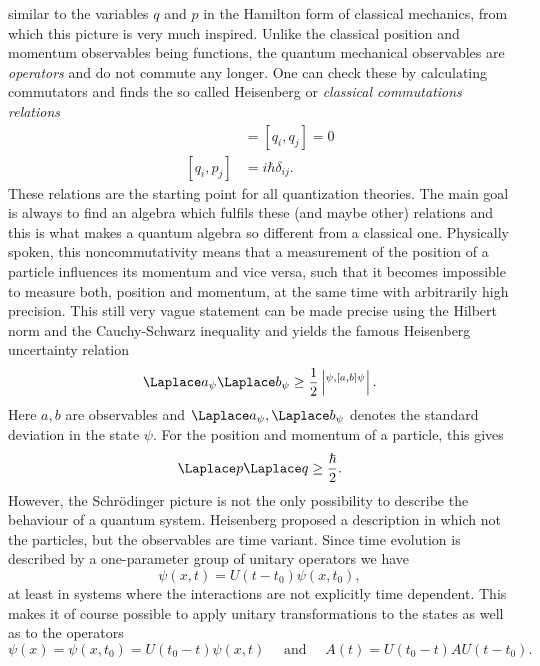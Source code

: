 similar to the variables $q$ and $p$ in the Hamilton form of classical 
mechanics, from which this picture is very much inspired. Unlike the classical 
position and momentum observables being functions, the quantum mechanical 
observables are \emph{operators} and do not commute any longer. One can check 
these by calculating commutators and finds the so called Heisenberg or 
\emph{classical commutations relations}
\begin{align}
	[p_i, p_j]
	& =
	[q_i, q_j]
	=
	0
	\\
	[q_i, p_j]
	& =
	i \hbar \delta_{ij}.
\end{align}
These relations are the starting point for all quantization theories. The main 
goal is always to find an algebra which fulfils these (and maybe other) 
relations and this is what makes a quantum algebra so different from a 
classical one. Physically spoken, this noncommutativity means that a 
measurement of the position of a particle influences its momentum and vice 
versa, such that it becomes impossible to measure both, position and momentum, 
at the same time with arbitrarily high precision. This still very vague 
statement can be made precise using the Hilbert norm and the Cauchy-Schwarz 
inequality and yields the famous Heisenberg uncertainty relation
\begin{equation*}
	\Laplace a_\psi
	\Laplace b_\psi
	\geq
	\frac{1}{2}
	\left|
		\sp{\psi, [a,b] \psi}
	\right|.
\end{equation*}
Here $a,b$ are observables and $\Laplace a_\psi, \Laplace b_\psi$ denotes the 
standard deviation in the state $\psi$. For the position and momentum of a 
particle, this gives
\begin{equation*}
	\Laplace p
	\Laplace q
	\geq
	\frac{\hbar}{2}.
\end{equation*}
However, the Schr\"odinger picture is not the only possibility to describe the 
behaviour of a quantum system. Heisenberg proposed a description in which not 
the particles, but the observables are time variant. Since time evolution is 
described by a one-parameter group of unitary operators we have
\begin{equation*}
	\psi(x,t)
	=
	U(t - t_0) \psi(x, t_0),
\end{equation*}
at least in systems where the interactions are not explicitly time dependent. 
This makes it of course possible to apply unitary transformations to the states 
as well as to the operators 
\begin{equation*}
	\psi(x)
	=
	\psi(x, t_0)
	=
	U(t_0 - t) \psi(x, t)
	\quad \text{ and } \quad
	A(t)
	=
	U(t_0 - t)
	A
	U(t - t_0).
\end{equation*}
